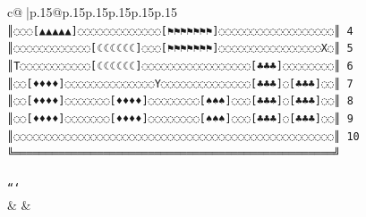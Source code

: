 \documentclass{article}
\begin{document}
{\begin{supertabular}{c@{$\;$}|p{.15\linewidth}@{}p{.15\linewidth}p{.15\linewidth}p{.15\linewidth}p{.15\linewidth}p{.15\linewidth}}
{{{\texttt{║◌◌◌{[}▲▲▲▲▲{]}◌◌◌◌◌◌◌◌◌◌◌◌◌{[}⚑⚑⚑⚑⚑⚑⚑{]}◌◌◌◌◌◌◌◌◌◌◌◌◌◌◌◌◌◌║ 4} \\
\texttt{║◌◌◌◌◌◌◌◌◌◌◌◌{[}☾☾☾☾☾☾{]}◌◌◌{[}⚑⚑⚑⚑⚑⚑⚑{]}◌◌◌◌◌◌◌◌◌◌◌◌◌◌◌◌X◌║ 5} \\
\texttt{║T◌◌◌◌◌◌◌◌◌◌◌{[}☾☾☾☾☾☾{]}◌◌◌◌◌◌◌◌◌◌◌◌◌◌◌◌◌{[}♣♣♣{]}◌◌◌◌◌◌◌◌║ 6} \\
\texttt{║◌◌{[}♦♦♦♦{]}◌◌◌◌◌◌◌◌◌◌◌◌◌◌Y◌◌◌◌◌◌◌◌◌◌◌◌◌◌{[}♣♣♣{]}◌{[}♣♣♣{]}◌◌║ 7} \\
\texttt{║◌◌{[}♦♦♦♦{]}◌◌◌◌◌◌◌{[}♦♦♦♦{]}◌◌◌◌◌◌◌◌{[}♠♠♠{]}◌◌◌{[}♣♣♣{]}◌{[}♣♣♣{]}◌◌║ 8} \\
\texttt{║◌◌{[}♦♦♦♦{]}◌◌◌◌◌◌◌{[}♦♦♦♦{]}◌◌◌◌◌◌◌◌{[}♠♠♠{]}◌◌◌{[}♣♣♣{]}◌{[}♣♣♣{]}◌◌║ 9} \\
\texttt{║◌◌◌◌◌◌◌◌◌◌◌◌◌◌◌◌◌◌◌◌◌◌◌◌◌◌◌◌◌◌◌◌◌◌◌◌◌◌◌◌◌◌◌◌◌◌◌◌◌◌║ 10} \\
\texttt{╚══════════════════════════════════════════════════╝} \\
\\ 
\texttt{```} \\
            }
        }
    }
    & & \\ \\


\end{supertabular}}
\end{document}
